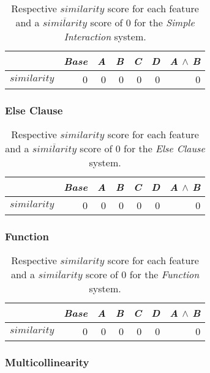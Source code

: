 \begin{table}[H]
    \centering
    \begin{tabular}{lrrrrrr}    \toprule
               & \emph{Base} & \emph{A} & \emph{B} & \emph{C} & \emph{D} & \emph{A} $\land$ \emph{B}   \\ \midrule
    $similarity$ & 0 & 0 & 0 & 0 & 0 & 0      \\ \bottomrule
    \end{tabular}
    \caption{Respective $similarity$ score for each feature and a $\overline{similarity}$ score of $0$ for the \emph{Simple Interaction} system.}
\end{table}

\subsubsection*{Else Clause}

\begin{table}[H]
    \centering
    \begin{tabular}{lrrrrrr}    \toprule
               & \emph{Base} & \emph{A} & \emph{B} & \emph{C} & \emph{D} & \emph{A} $\land$ \emph{B}   \\ \midrule
    $similarity$ & 0 & 0 & 0 & 0 & 0 & 0      \\ \bottomrule
    \end{tabular}
    \caption{Respective $similarity$ score for each feature and a $\overline{similarity}$ score of $0$ for the \emph{Else Clause} system.}
\end{table}

\subsubsection*{Function}

\begin{table}[H]
    \centering
    \begin{tabular}{lrrrrrr}    \toprule
               & \emph{Base} & \emph{A} & \emph{B} & \emph{C} & \emph{D} & \emph{A} $\land$ \emph{B}   \\ \midrule
    $similarity$ & 0 & 0 & 0 & 0 & 0 & 0      \\ \bottomrule
    \end{tabular}
    \caption{Respective $similarity$ score for each feature and a $\overline{similarity}$ score of $0$ for the \emph{Function} system.}
\end{table}
    
\subsubsection*{Multicollinearity}

